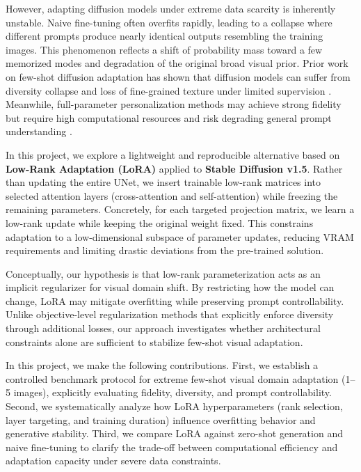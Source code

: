 \documentclass{article}
\begin{document}
However, adapting diffusion models under extreme data scarcity is inherently unstable. Naive fine-tuning often overfits rapidly, leading to a collapse where different prompts produce nearly identical outputs resembling the training images. This phenomenon reflects a shift of probability mass toward a few memorized modes and degradation of the original broad visual prior. Prior work on few-shot diffusion adaptation has shown that diffusion models can suffer from diversity collapse and loss of fine-grained texture under limited supervision \cite{zhu2023fewshot}. Meanwhile, full-parameter personalization methods may achieve strong fidelity but require high computational resources and risk degrading general prompt understanding \cite{ruiz2023dreamboothfinetuningtexttoimage}.

In this project, we explore a lightweight and reproducible alternative based on \textbf{Low-Rank Adaptation (LoRA)} \cite{hu2021loralowrankadaptationlarge} applied to \textbf{Stable Diffusion v1.5}. Rather than updating the entire UNet, we insert trainable low-rank matrices into selected attention layers (cross-attention and self-attention) while freezing the remaining parameters. Concretely, for each targeted projection matrix, we learn a low-rank update while keeping the original weight fixed. This constrains adaptation to a low-dimensional subspace of parameter updates, reducing VRAM requirements and limiting drastic deviations from the pre-trained solution.

Conceptually, our hypothesis is that low-rank parameterization acts as an implicit regularizer for visual domain shift. By restricting how the model can change, LoRA may mitigate overfitting while preserving prompt controllability. Unlike objective-level regularization methods that explicitly enforce diversity through additional losses, our approach investigates whether architectural constraints alone are sufficient to stabilize few-shot visual adaptation.

In this project, we make the following contributions. First, we establish a controlled benchmark protocol for extreme few-shot visual domain adaptation (1--5 images), explicitly evaluating fidelity, diversity, and prompt controllability. Second, we systematically analyze how LoRA hyperparameters (rank selection, layer targeting, and training duration) influence overfitting behavior and generative stability. Third, we compare LoRA against zero-shot generation and naive fine-tuning to clarify the trade-off between computational efficiency and adaptation capacity under severe data constraints.
\end{document}
